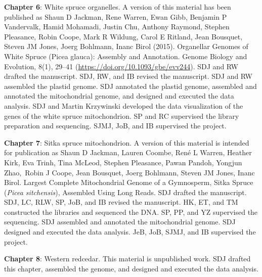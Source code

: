 \documentclass[
  12pt,
  oneside,
  openany]{book}
\begin{document}
\textbf{Chapter 6}: White spruce organelles. A version of this material has been published as Shaun D Jackman, Rene Warren, Ewan Gibb, Benjamin P Vandervalk, Hamid Mohamadi, Justin Chu, Anthony Raymond, Stephen Pleasance, Robin Coope, Mark R Wildung, Carol E Ritland, Jean Bousquet, Steven JM Jones, Joerg Bohlmann, Inanc Birol (2015). Organellar Genomes of White Spruce (Picea glauca): Assembly and Annotation. Genome Biology and Evolution, 8(1), 29--41 (\url{https://doi.org/10.1093/gbe/evv244}). SDJ and RW drafted the manuscript. SDJ, RW, and IB revised the manuscript. SDJ and RW assembled the plastid genome. SDJ annotated the plastid genome, assembled and annotated the mitochondrial genome, and designed and executed the data analysis. SDJ and Martin Krzywinski developed the data visualization of the genes of the white spruce mitochondrion. SP and RC supervised the library preparation and sequencing. SJMJ, JoB, and IB supervised the project.

\textbf{Chapter 7}: Sitka spruce mitochondrion. A version of this material is intended for publication as Shaun D Jackman, Lauren Coombe, René L Warren, Heather Kirk, Eva Trinh, Tina McLeod, Stephen Pleasance, Pawan Pandoh, Yongjun Zhao,~Robin J Coope, Jean Bousquet, Joerg Bohlmann, Steven JM Jones, Inanc Birol. Largest Complete Mitochondrial Genome of a Gymnosperm, Sitka Spruce (\emph{Picea sitchensis}), Assembled Using Long Reads. SDJ drafted the manuscript. SDJ, LC, RLW, SP, JoB, and IB revised the manuscript. HK, ET, and TM constructed the libraries and sequenced the DNA. SP, PP, and YZ supervised the sequencing. SDJ assembled and annotated the mitochondrial genome. SDJ designed and executed the data analysis. JeB, JoB, SJMJ, and IB supervised the project.

\textbf{Chapter 8}: Western redcedar. This material is unpublished work. SDJ drafted this chapter, assembled the genome, and designed and executed the data analysis.

\newpage

\tableofcontents
{}

\newpage

\listoftables
{}

\newpage

\listoffigures
{}

\newpage

\markboth{}{}

\newpage
\end{document}
